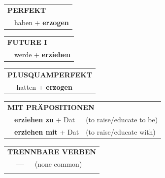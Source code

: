 \documentclass[10pt,a4paper]{revtex4-2}
\begin{document}
\begin{verbbox}
    \vspace{10pt}

 \begin{tabular}{rl}
     \multicolumn{2}{l}{\textbf{PERFEKT}}\\
   & haben + \textbf{erzogen}\\
  \end{tabular}
\hfill
   \begin{tabular}{rl}
    \multicolumn{2}{l}{\textbf{FUTURE I} }\\
   & werde + \textbf{erziehen}\\
  \end{tabular}
\hfill
   \begin{tabular}{rl}
      \multicolumn{2}{l}{\textbf{PLUSQUAMPERFEKT}}\\
   & hatten + \textbf{erzogen}\\
  \end{tabular}

   \vspace{10pt}

   \begin{tabular}{lll}
      \multicolumn{3}{l}{\textbf{MIT PRÄPOSITIONEN}}\\
& \textbf{erziehen zu} + Dat & (to raise/educate to be)\\
& \textbf{erziehen mit} + Dat & (to raise/educate with)\\
\end{tabular}
  \hfill
   \begin{tabular}{lll}
      \multicolumn{3}{l}{\textbf{TRENNBARE VERBEN}}\\
 & \textbf{---} & (none common)\\
\vspace{10pt}
  \end{tabular}

  \vspace{-5pt}

\end{verbbox}
\end{document}
